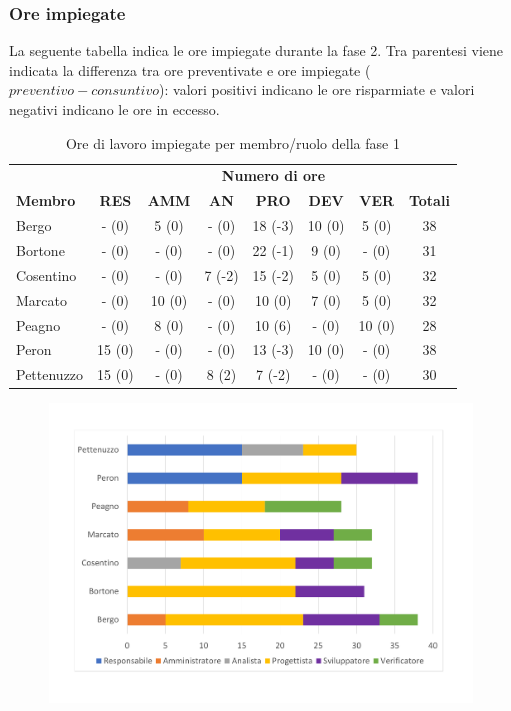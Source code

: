 	\subsubsection{Ore impiegate}
		La seguente tabella indica le ore impiegate durante la fase 2. Tra parentesi viene indicata la differenza tra ore preventivate e ore impiegate ($preventivo - consuntivo$): valori positivi indicano le ore risparmiate e valori negativi indicano le ore in eccesso.
		\begin{table}[h]
			\centering
		\begin{tabular}{| l | c c c c c c | c |}
			\rowcolor{LightBlue}
			& \multicolumn{7}{c}{\textbf{\color{white}Numero di ore}}	\\
	
			\rowcolor{LightBlue}
			\textbf{\color{white}Membro}
			& \textbf{\color{white}RES}
			& \textbf{\color{white}AMM}
			& \textbf{\color{white}AN}
			& \textbf{\color{white}PRO}
			& \textbf{\color{white}DEV}
			& \textbf{\color{white}VER}
			& \textbf{\color{white}Totali}\\
	
			Bergo     		& -  (0)		& 5  (0) 	& -  (0) 		& 18 (-3) & 10 (0) & 5  (0) 	& 38\\
			Bortone   		& -  (0)		& -  (0) 	& -  (0) 		& 22 (-1) & 9 (0) & -  (0)	& 31\\
			Cosentino 		& -  (0)	 	& -  (0) 	& 7  (-2) 		& 15 (-2) & 5 (0) & 5  (0)	& 32\\
			Marcato   		& -  (0) 		& 10  (0) 	& -  (0) 		& 10 (0) & 7 (0) & 5  (0)	& 32\\
			Peagno    		& -  (0) 		& 8  (0) 	& -  (0) 		& 10 (6) & - (0) & 10  (0)	& 28\\
			Peron     		& 15  (0)		& -  (0) 	& -  (0) 		& 13 (-3) & 10 (0) & -  (0)	& 38\\
			Pettenuzzo 		& 15  (0) 		& -  (0) 	& 8  (2) 		& 7 (-2) & - (0) & -  (0)	& 30\\ \hline
		\end{tabular}
		\caption{Ore di lavoro impiegate per membro/ruolo della fase 1}
	\end{table}
	
		\begin{figure}[h]
	\centering
	\includegraphics[scale=0.45]{images/consuntivoRP.pdf}
	\caption{}
\end{figure}
